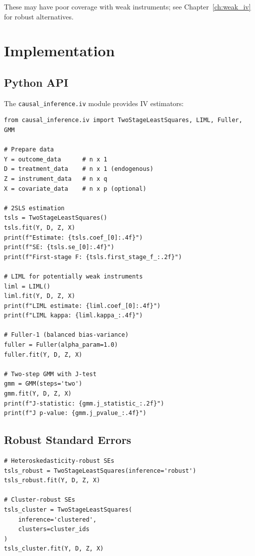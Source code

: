 These may have poor coverage with weak instruments; see Chapter~\ref{ch:weak_iv} for robust alternatives.


\section{Implementation}
\label{sec:iv_implementation}

\subsection{Python API}

The \texttt{causal\_inference.iv} module provides IV estimators:

\begin{verbatim}
from causal_inference.iv import TwoStageLeastSquares, LIML, Fuller, GMM

# Prepare data
Y = outcome_data      # n x 1
D = treatment_data    # n x 1 (endogenous)
Z = instrument_data   # n x q
X = covariate_data    # n x p (optional)

# 2SLS estimation
tsls = TwoStageLeastSquares()
tsls.fit(Y, D, Z, X)
print(f"Estimate: {tsls.coef_[0]:.4f}")
print(f"SE: {tsls.se_[0]:.4f}")
print(f"First-stage F: {tsls.first_stage_f_:.2f}")

# LIML for potentially weak instruments
liml = LIML()
liml.fit(Y, D, Z, X)
print(f"LIML estimate: {liml.coef_[0]:.4f}")
print(f"LIML kappa: {liml.kappa_:.4f}")

# Fuller-1 (balanced bias-variance)
fuller = Fuller(alpha_param=1.0)
fuller.fit(Y, D, Z, X)

# Two-step GMM with J-test
gmm = GMM(steps='two')
gmm.fit(Y, D, Z, X)
print(f"J-statistic: {gmm.j_statistic_:.2f}")
print(f"J p-value: {gmm.j_pvalue_:.4f}")
\end{verbatim}

\subsection{Robust Standard Errors}

\begin{verbatim}
# Heteroskedasticity-robust SEs
tsls_robust = TwoStageLeastSquares(inference='robust')
tsls_robust.fit(Y, D, Z, X)

# Cluster-robust SEs
tsls_cluster = TwoStageLeastSquares(
    inference='clustered',
    clusters=cluster_ids
)
tsls_cluster.fit(Y, D, Z, X)
\end{verbatim}

